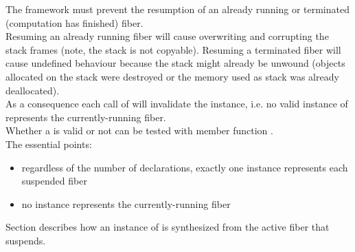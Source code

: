 \label{invalidation}

The framework must prevent the resumption of an already running or terminated
(computation has finished) fiber.\\
Resuming an already running fiber will cause overwriting and corrupting the stack
frames (note, the stack is not copyable).  Resuming a terminated fiber will
cause undefined behaviour because the stack might already be unwound (objects
allocated on the stack were destroyed or the memory used as stack was already
deallocated).\\
As a consequence each call of \resume will invalidate the \fiber instance, i.e.
no valid instance of \fiber represents the currently-running fiber.\\
Whether a \fiber is valid or not can be tested with member function \opbool.\\

The essential points:
\begin{itemize}
    \item regardless of the number of \fiber declarations, exactly one \fiber
          instance represents each suspended fiber
    \item no \fiber instance represents the currently-running fiber
\end{itemize}

Section  describes how an instance of \fiber is
synthesized from the active fiber that suspends.\\

